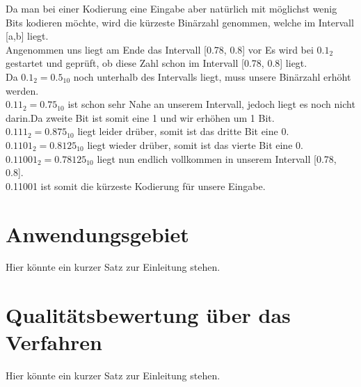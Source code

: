\documentclass[a4paper]{article}
\theoremstyle{definition}
\theoremstyle{remark}
\begin{document}
Da man bei einer Kodierung eine Eingabe aber natürlich mit möglichst wenig Bits kodieren möchte, wird die kürzeste Binärzahl genommen, welche im Intervall [a,b] liegt.\\
Angenommen uns liegt am Ende das Intervall [0.78, 0.8] vor
Es wird bei $0.1_2$ gestartet und geprüft, ob diese Zahl schon im Intervall [0.78, 0.8] liegt.\\
Da $0.1_2 = 0.5_{10}$ noch unterhalb des Intervalls liegt, muss unsere Binärzahl erhöht werden.\\
$0.11_2 = 0.75_{10}$ ist schon sehr Nahe an unserem Intervall, jedoch liegt es noch nicht darin.Da zweite Bit ist somit eine 1 und wir erhöhen um 1 Bit.\\
$0.111_2 = 0.875_{10}$ liegt leider drüber, somit ist das dritte Bit eine 0.
\\
$0.1101_2 = 0.8125_{10}$ liegt wieder drüber, somit ist das vierte Bit eine 0.
\\
$0.11001_2 = 0.78125_{10}$ liegt nun endlich vollkommen in unserem Intervall [0.78, 0.8].
\\
0.11001 ist somit die kürzeste Kodierung für unsere Eingabe.
		\section{Anwendungsgebiet}
	Hier könnte ein kurzer Satz zur Einleitung stehen.
	
			\section{Qualitätsbewertung über das Verfahren}
	Hier könnte ein kurzer Satz zur Einleitung stehen.
	
	\newpage
\end{document}
